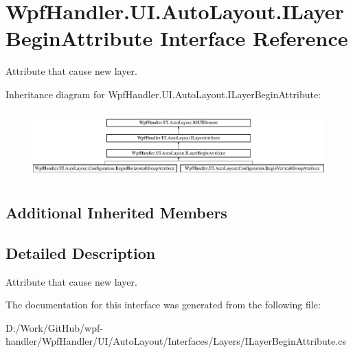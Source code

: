 \hypertarget{interface_wpf_handler_1_1_u_i_1_1_auto_layout_1_1_i_layer_begin_attribute}{}\section{Wpf\+Handler.\+U\+I.\+Auto\+Layout.\+I\+Layer\+Begin\+Attribute Interface Reference}
\label{interface_wpf_handler_1_1_u_i_1_1_auto_layout_1_1_i_layer_begin_attribute}


Attribute that cause new layer.  


Inheritance diagram for Wpf\+Handler.\+U\+I.\+Auto\+Layout.\+I\+Layer\+Begin\+Attribute\+:\begin{figure}[H]
\begin{center}
\leavevmode
\includegraphics[height=2.635294cm]{d5/d7b/interface_wpf_handler_1_1_u_i_1_1_auto_layout_1_1_i_layer_begin_attribute}
\end{center}
\end{figure}
\subsection*{Additional Inherited Members}


\subsection{Detailed Description}
Attribute that cause new layer. 



The documentation for this interface was generated from the following file\+:\begin{DoxyCompactItemize}
\item 
D\+:/\+Work/\+Git\+Hub/wpf-\/handler/\+Wpf\+Handler/\+U\+I/\+Auto\+Layout/\+Interfaces/\+Layers/I\+Layer\+Begin\+Attribute.\+cs\end{DoxyCompactItemize}
